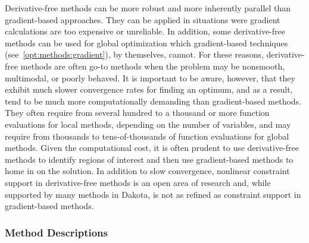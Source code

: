 Derivative-free methods can be more robust and more inherently
parallel than gradient-based approaches. They can be applied in
situations were gradient calculations are too expensive or
unreliable. In addition, some derivative-free methods can be used for
global optimization which gradient-based techniques
(see~\ref{opt:methods:gradient}), by themselves,
cannot. For these reasons, derivative-free methods are often go-to
methods when the problem may be nonsmooth, multimodal, or poorly
behaved.  It is important to be aware, however, that they exhibit much
slower convergence rates for finding an optimum, and as a result, tend
to be much more computationally demanding than gradient-based
methods. They often require from several hundred to a thousand or more
function evaluations for local methods, depending on the number of
variables, and may require from thousands to tens-of-thousands of
function evaluations for global methods. Given the computational cost,
it is often prudent to use derivative-free methods to identify regions
of interest and then use gradient-based methods to home in on the
solution.  In addition to slow convergence, nonlinear constraint
support in derivative-free methods is an open area of research and,
while supported by many methods in Dakota, is not as refined as
constraint support in gradient-based methods.

\subsubsection{Method Descriptions}
\label{opt:methods:gradientfree:local:descriptions}

